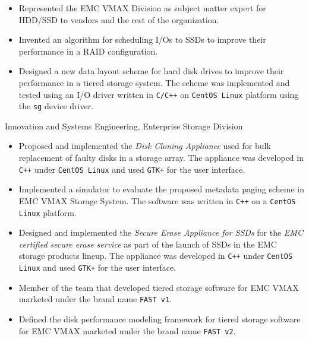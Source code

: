 {
	\begin{itemize}
		\item Represented the EMC VMAX Division as subject matter expert for HDD/SSD to vendors
			and the rest of the organization.
		\item Invented an algorithm for scheduling I/Os to SSDs to improve
			their performance in a RAID configuration.
		\item Designed a new data layout scheme for hard disk drives to improve
			their performance in a tiered storage system.
			The scheme was implemented and tested using an I/O driver written
			in \texttt{C/C++} on \texttt{CentOS Linux} platform using the \texttt{sg} device driver.
	\end{itemize}
}
{Innovation and Systems Engineering, Enterprise Storage Division}
{
	\begin{itemize}
        \item Proposed and implemented the {\em Disk Cloning Appliance} used for bulk
            replacement of faulty disks in a storage array. The appliance was
			developed in \texttt{C++} under \texttt{CentOS Linux} and used \texttt{GTK+} for the user
			interface.
		\item Implemented a simulator to evaluate the proposed metadata paging
			scheme in EMC VMAX Storage System. The software was written in
			\texttt{C++} on a \texttt{CentOS Linux} platform.
	\end{itemize}
}
{ 
	\begin{itemize}
		\item Designed and implemented the {\em Secure Erase Appliance for SSDs}
			for the {\em EMC certified secure erase service} as part of the
			launch of SSDs in the EMC storage products lineup. The appliance was
			developed in \texttt{C++} under \texttt{CentOS Linux} and used 
			\texttt{GTK+} for the user interface.
		\item Member of the team that developed tiered storage software for
			EMC VMAX marketed under the brand name \texttt{FAST v1}.
		\item Defined the disk performance modeling framework for tiered storage
			software for EMC VMAX marketed under the brand name \texttt{FAST v2}.
	\end{itemize}
}
